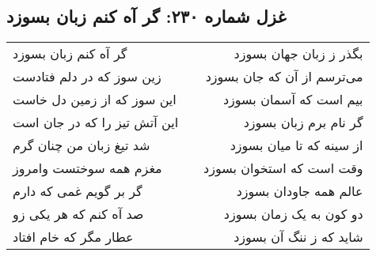 \begin{center}
\section*{غزل شماره ۲۳۰: گر آه کنم زبان بسوزد}
\label{sec:230}
\begin{longtable}{l p{0.5cm} r}
گر آه کنم زبان بسوزد
&&
بگذر ز زبان جهان بسوزد
\\
زین سوز که در دلم فتادست
&&
می‌ترسم از آن که جان بسوزد
\\
این سوز که از زمین دل خاست
&&
بیم است که آسمان بسوزد
\\
این آتش تیز را که در جان است
&&
گر نام برم زبان بسوزد
\\
شد تیغ زبان من چنان گرم
&&
از سینه که تا میان بسوزد
\\
مغزم همه سوختست وامروز
&&
وقت است که استخوان بسوزد
\\
گر بر گویم غمی که دارم
&&
عالم همه جاودان بسوزد
\\
صد آه کنم که هر یکی زو
&&
دو کون به یک زمان بسوزد
\\
عطار مگر که خام افتاد
&&
شاید که ز ننگ آن بسوزد
\\
\end{longtable}
\end{center}
